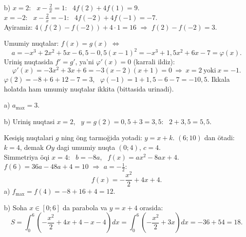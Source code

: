 b) $x=2$: \ $x-\frac2x=1$: \ $4f(2)+4f(1)=9$.\\
\phantom{b) }$x=-2$: \ $x-\frac2x=-1$: \ $4f(-2)+4f(-1)=-7$.\\
Ayiramiz: $4\left(f(2)-f(-2)\right)+4\cdot1=16$ $\Rightarrow$ $f(2)-f(-2)=3$.

\newpage
{}
Umumiy nuqtalar: $f(x)=g(x)$ $\Leftrightarrow$
\[a=-x^3+2x^2+5x-6{,}5-0{,}5(x-1)^2=-x^3+1{,}5x^2+6x-7=\varphi(x).\]
Uriniş nuqtasida $f'=g'$, ya'ni $\varphi'(x)=0$ (karrali ildiz):
\[\varphi'(x)=-3x^2+3x+6=-3(x-2)(x+1)=0\ \Rightarrow\ x=2\ \text{yoki}\ x=-1.\]
$\varphi(2)=-8+6+12-7=3$, \ $\varphi(-1)=1+1{,}5-6-7=-10{,}5$. Ikkala holatda ham umumiy nuqtalar ikkita (bittasida urinadi).

a) $a_{\max}=3$.

b) Uriniş nuqtasi $x=2$, \ $y=g(2)=0{,}5+3=3{,}5$: \ $2+3{,}5=5{,}5$.

\newpage
{}
Kesişiş nuqtalari $g$ ning öng tarmoğida yotadi: $y=x+k$. $(6;10)$ dan ötadi: $k=4$, demak $Oy$ dagi umumiy nuqta $(0;4)$, $c=4$.\\
Simmetriya öqi $x=4$: \ $b=-8a$, \ $f(x)=ax^2-8ax+4$. \ $f(6)=36a-48a+4=10$ $\Rightarrow$ $a=-\frac12$:
\[f(x)=-\frac{x^2}2+4x+4.\]
a) $f_{\max}=f(4)=-8+16+4=12$.

b) Soha $x\in[0;6]$ da parabola va $y=x+4$ orasida:
\[S=\int_0^6\left(-\frac{x^2}2+4x+4-x-4\right)dx=\int_0^6\left(-\frac{x^2}2+3x\right)dx=-36+54=18.\]

